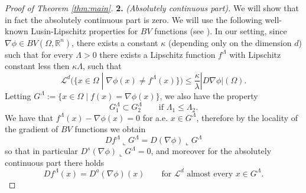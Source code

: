 \documentclass[11pt, twoside, reqno]{amsart}
\theoremstyle{definition} \newtheorem{definition}{Definition}[section]
\theoremstyle{definition} \newtheorem{remark}[definition]{Remark}
\theoremstyle{plain} \newtheorem{lemma}[definition]{Lemma}
\theoremstyle{plain} \newtheorem{proposition}[definition]{Proposition}
\theoremstyle{plain} \newtheorem{theorem}[definition]{Theorem}
\theoremstyle{plain} \newtheorem{corollary}[definition]{Corollary}
\theoremstyle{definition} \newtheorem{example}[definition]{Example}
\theoremstyle{plain} \newtheorem{claim}[clai]{Claim}
\theoremstyle{definition} \newtheorem{assumption}[definition]{Assumption}
\newcommand{\1}{\mathbbm 1}
\numberwithin{equation}{section} %
\theoremstyle{plain} \newtheorem*{theorem*}{Theorem}
\theoremstyle{plain} \newtheorem{mthm}[maintheorem]{Main Theorem}
\theoremstyle{plain} \newtheorem*{mthm*}{Main Theorem}
\theoremstyle{plain} \newtheorem*{conjecture*}{Conjecture}
\theoremstyle{plain} \newtheorem{conjecture}[definition]{Conjecture}
\theoremstyle{plain} \newtheorem*{problem*}{Problem}
\begin{document}
\begin{proof}[Proof of Theorem \ref{thm:main}]
\vspace{0.5cm}
\textbf{2.} \emph{(Absolutely continuous part).} We will show that in fact the absolutely continuous part is zero. We will use the following well-known Lusin-Lipschitz properties for $BV$ functions (see \cite[Theorem 5.34]{AFP_book}). In our setting, since $\nabla \phi \in BV(\Omega, \mathbb R^n)$, there exists a constant $\kappa$ (depending only on the dimension $d$) such that for every $\Lambda > 0$ there exists a Lipschitz function $f^\Lambda$ with Lipschitz constant less then $\kappa \Lambda$, such that 
$$
\mathscr L^d \Big( \big\{ x \in \Omega \; | \; \nabla \phi(x) \neq f^\Lambda(x)  \big\} \Big) \leq \frac{\kappa}{\lambda}|D \nabla \phi|(\Omega).
$$
Letting $G^\Lambda := \{ x \in \Omega \; | \; f(x) = \nabla \phi(x)\}$, we also have the property
$$
G^\Lambda_1 \subset G^\Lambda_2 \qquad \text{if $\Lambda_1 \leq \Lambda_2$}.
$$
 We have that $f^\Lambda(x)-\nabla \phi(x) = 0$ for a.e.  $ x \in G^\Lambda$, therefore by the locality of the gradient of $BV$ functions we obtain $$Df^\Lambda \llcorner G^\Lambda = D (\nabla \phi) \llcorner G^\Lambda$$
so that in particular $D^s (\nabla \phi) \llcorner G^\Lambda = 0$, and moreover for the absolutely continuous part there holds
\begin{equation}\label{eq:locgr}
D f^\Lambda(x) = D^a (\nabla \phi)(x) \qquad \text{for $\mathscr L^d$ almost every $x \in G^\Lambda$}.
\end{equation}


\end{proof}
\end{document}
